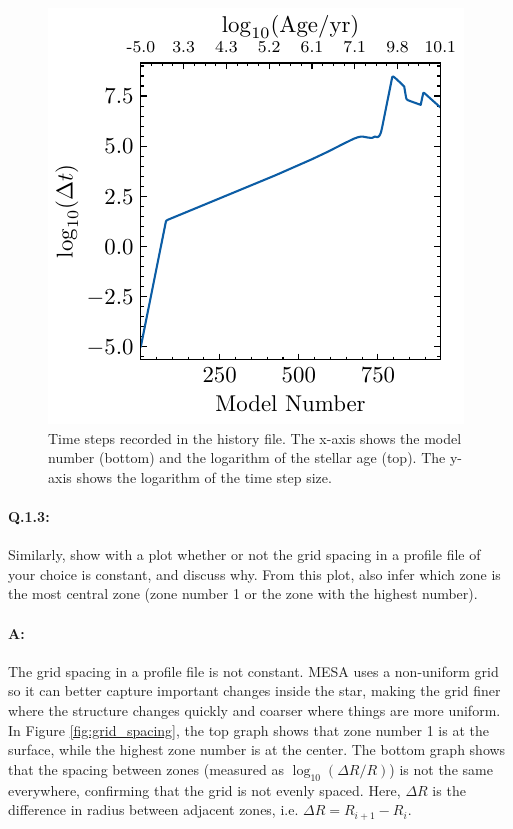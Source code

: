 \documentclass[twocolumn,fontsize=11pt]{scrartcl}
\begin{document}
\begin{figure}[htbp]
    \centering
    \includegraphics{log_dt_vs_model_number.pdf}
    \caption{Time steps recorded in the history file. The x-axis shows the model number (bottom) and the logarithm of the stellar age (top). The y-axis shows the logarithm of the time step size.}
    \label{fig:time_steps}
\end{figure}

\paragraph{Q.1.3:} Similarly, show with a plot whether or not the grid spacing in a profile file of your
choice is constant, and discuss why. From this plot, also infer which zone is the most  
central zone (zone number 1 or the zone with the highest number).

\paragraph{A:} The grid spacing in a profile file is not constant. MESA uses a non-uniform grid so it can better capture important changes inside the star, making the grid finer where the structure changes quickly and coarser where things are more uniform. In Figure \ref{fig:grid_spacing}, the top graph shows that zone number 1 is at the surface, while the highest zone number is at the center. The bottom graph shows that the spacing between zones (measured as \(\log_{10}(\Delta R / R)\)) is not the same everywhere, confirming that the grid is not evenly spaced. Here, \(\Delta R\) is the difference in radius between adjacent zones, i.e. \(\Delta R = R_{i+1} - R_i\).
\end{document}
